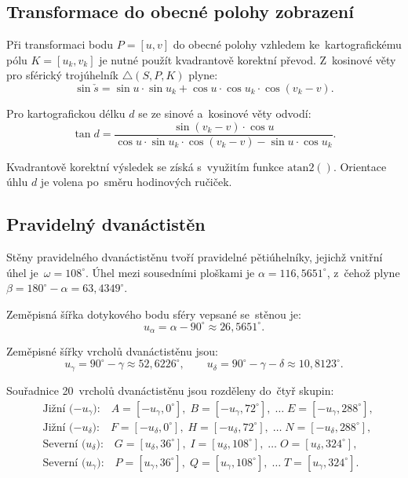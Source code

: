 \documentclass[11pt, a4paper]{article}
\begin{document}
\subsection{Transformace do obecné polohy zobrazení}

Při transformaci bodu $P = [u, v]$ do obecné polohy vzhledem ke~kartografickému pólu $K = [u_k, v_k]$ je nutné použít kvadrantově korektní převod. Z~kosinové věty pro sférický trojúhelník $\triangle(S, P, K)$ plyne:
\begin{equation}
    \sin \check{s} = \sin u \cdot \sin u_k + \cos u \cdot \cos u_k \cdot \cos(v_k - v).
\end{equation}

Pro kartografickou délku $d$ se ze sinové a~kosinové věty odvodí:
\begin{equation}
    \tan d = \frac{\sin(v_k - v) \cdot \cos u}{\cos u \cdot \sin u_k \cdot \cos(v_k - v) - \sin u \cdot \cos u_k}.
\end{equation}

Kvadrantově korektní výsledek se získá s~využitím funkce $\mathrm{atan2}()$. Orientace úhlu $d$ je volena po~směru hodinových ručiček.

\subsection{Pravidelný dvanáctistěn}

Stěny pravidelného dvanáctistěnu tvoří pravidelné pětiúhelníky, jejichž vnitřní úhel je~$\omega = 108^{\circ}$. Úhel mezi sousedními ploškami je $\alpha = 116{,}5651^{\circ}$, z~čehož plyne $\beta = 180^{\circ} - \alpha = 63{,}4349^{\circ}$.

Zeměpisná šířka dotykového bodu sféry vepsané se~stěnou je:
\begin{equation}
    u_\alpha = \alpha - 90^{\circ} \approx 26{,}5651^{\circ}.
\end{equation}

Zeměpisné šířky vrcholů dvanáctistěnu jsou:
\begin{equation}
    u_\gamma = 90^{\circ} - \gamma \approx 52{,}6226^{\circ}, \qquad u_\delta = 90^{\circ} - \gamma - \delta \approx 10{,}8123^{\circ}.
\end{equation}

Souřadnice 20~vrcholů dvanáctistěnu jsou rozděleny do~čtyř skupin:
\begin{align}
    &\text{Jižní ($-u_\gamma$):} \quad A = [-u_\gamma, 0^{\circ}], \; B = [-u_\gamma, 72^{\circ}], \; \ldots \; E = [-u_\gamma, 288^{\circ}], \\
    &\text{Jižní ($-u_\delta$):} \quad F = [-u_\delta, 0^{\circ}], \; H = [-u_\delta, 72^{\circ}], \; \ldots \; N = [-u_\delta, 288^{\circ}], \\
    &\text{Severní ($u_\delta$):} \quad G = [u_\delta, 36^{\circ}], \; I = [u_\delta, 108^{\circ}], \; \ldots \; O = [u_\delta, 324^{\circ}], \\
    &\text{Severní ($u_\gamma$):} \quad P = [u_\gamma, 36^{\circ}], \; Q = [u_\gamma, 108^{\circ}], \; \ldots \; T = [u_\gamma, 324^{\circ}].
\end{align}
\end{document}
